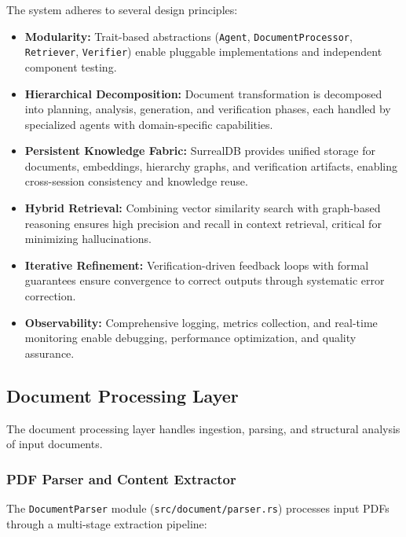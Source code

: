 \documentclass{ieeeaccess}
\begin{document}
The system adheres to several design principles:

\begin{itemize}
\item \textbf{Modularity:} Trait-based abstractions (\texttt{Agent}, \texttt{DocumentProcessor}, \texttt{Retriever}, \texttt{Verifier}) enable pluggable implementations and independent component testing.

\item \textbf{Hierarchical Decomposition:} Document transformation is decomposed into planning, analysis, generation, and verification phases, each handled by specialized agents with domain-specific capabilities.

\item \textbf{Persistent Knowledge Fabric:} SurrealDB provides unified storage for documents, embeddings, hierarchy graphs, and verification artifacts, enabling cross-session consistency and knowledge reuse.

\item \textbf{Hybrid Retrieval:} Combining vector similarity search with graph-based reasoning ensures high precision and recall in context retrieval, critical for minimizing hallucinations.

\item \textbf{Iterative Refinement:} Verification-driven feedback loops with formal guarantees ensure convergence to correct outputs through systematic error correction.

\item \textbf{Observability:} Comprehensive logging, metrics collection, and real-time monitoring enable debugging, performance optimization, and quality assurance.
\end{itemize}

\subsection{Document Processing Layer}

The document processing layer handles ingestion, parsing, and structural analysis of input documents.

\subsubsection{PDF Parser and Content Extractor}

The \texttt{DocumentParser} module (\texttt{src/document/parser.rs}) processes input PDFs through a multi-stage extraction pipeline:
\end{document}
